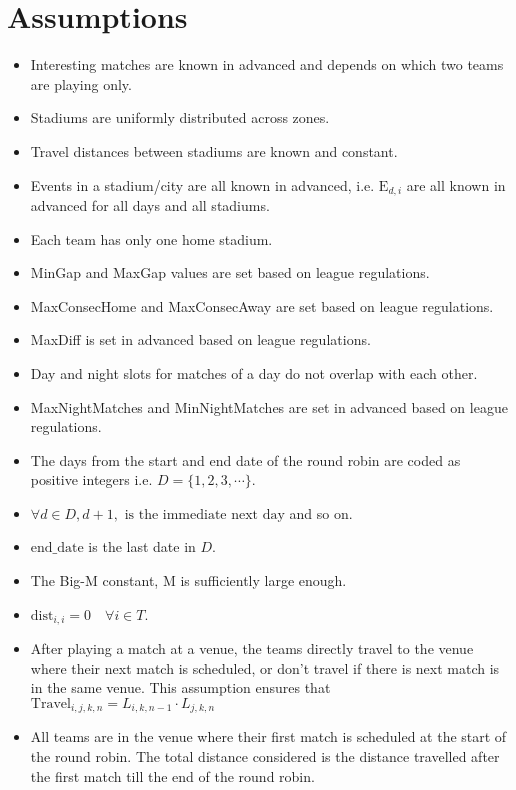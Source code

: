 \documentclass[a4paper, 12pt]{article}
\begin{document}
\section*{Assumptions}
\begin{itemize}
    \item Interesting matches are known in advanced and depends on which two teams are playing only.
    \item Stadiums are uniformly distributed across zones.
    \item Travel distances between stadiums are known and constant.
    \item Events in a stadium/city are all known in advanced, i.e. $\text{E}_{d,i}$ are all known in advanced for all days and all stadiums.
    \item Each team has only one home stadium.
    \item MinGap and MaxGap values are set based on league regulations.
    \item MaxConsecHome and MaxConsecAway are set based on league regulations.
    \item MaxDiff is set in advanced based on league regulations.
    \item Day and night slots for matches of a day do not overlap with each other.
    \item MaxNightMatches and MinNightMatches are set in advanced based on league regulations.
    \item The days from the start and end date of the round robin are coded as positive integers i.e. $D = \{1,2,3, \cdots \}$.
    \item $\forall d \in D, d+1, \text{ is the immediate next day}$ and so on. 
    \item $\text{end\_date}$ is the last date in $D$.
    \item The Big-M constant, M is sufficiently large enough.
    \item $\text{dist}_{i,i} = 0 \quad \forall i \in T$.
    \item After playing a match at a venue, the teams directly travel to the venue where their next match is scheduled, or don't travel if there is next match is in the same venue. This assumption ensures that $\text{Travel}_{i,j,k,n} = L_{i,k,n-1}\cdot L_{j,k,n}$
    \item All teams are in the venue where their first match is scheduled at the start of the round robin. The total distance considered is the distance travelled after the first match till the end of the round robin. 
\end{itemize}
\end{document}
